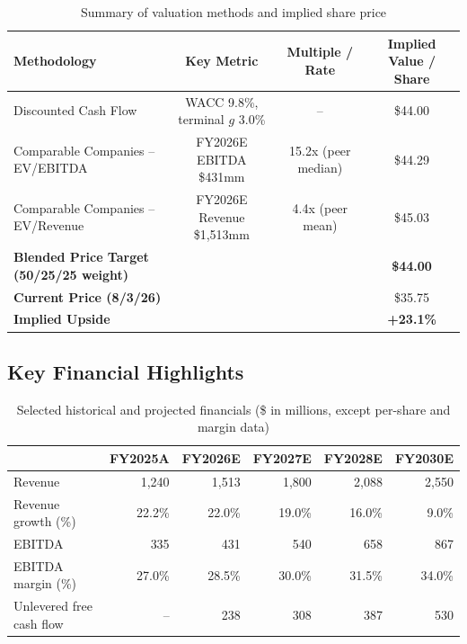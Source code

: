 \begin{table}[H]
\centering
\small
\caption{Summary of valuation methods and implied share price}
\label{tab:valuation-summary}
\begin{tabular}{@{}l c c c@{}}
\toprule
\textbf{Methodology} & \textbf{Key Metric} & \textbf{Multiple / Rate} & \textbf{Implied Value / Share} \\
\midrule
Discounted Cash Flow & WACC 9.8\%, terminal $g$ 3.0\% & -- & \$44.00 \\
Comparable Companies -- EV/EBITDA & FY2026E EBITDA \$431mm & 15.2x (peer median) & \$44.29 \\
Comparable Companies -- EV/Revenue & FY2026E Revenue \$1,513mm & 4.4x (peer mean) & \$45.03 \\
\midrule
\textbf{Blended Price Target (50/25/25 weight)} & & & \textbf{\$44.00} \\
\textbf{Current Price (8/3/26)} & & & \$35.75 \\
\textbf{Implied Upside} & & & \textbf{+23.1\%} \\
\bottomrule
\end{tabular}
\end{table}

\subsection{Key Financial Highlights}

\begin{table}[H]
\centering
\small
\caption{Selected historical and projected financials (\$ in millions, except per-share and margin data)}
\label{tab:key-highlights}
\begin{tabular}{@{}lrrrrr@{}}
\toprule
& \textbf{FY2025A} & \textbf{FY2026E} & \textbf{FY2027E} & \textbf{FY2028E} & \textbf{FY2030E} \\
\midrule
Revenue & 1,240 & 1,513 & 1,800 & 2,088 & 2,550 \\
Revenue growth (\%) & 22.2\% & 22.0\% & 19.0\% & 16.0\% & 9.0\% \\
EBITDA & 335 & 431 & 540 & 658 & 867 \\
EBITDA margin (\%) & 27.0\% & 28.5\% & 30.0\% & 31.5\% & 34.0\% \\
Unlevered free cash flow & -- & 238 & 308 & 387 & 530 \\
\bottomrule
\end{tabular}
\end{table}
